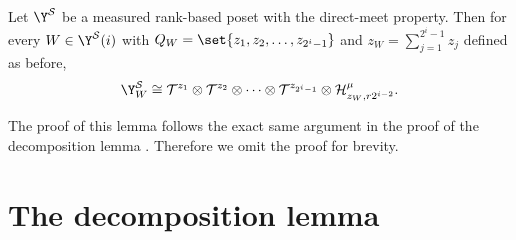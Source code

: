 \begin{lemma}
  Let \(\Y^{\mathcal{S}}\) be a measured rank-based poset with the direct-meet property. Then for every \(W \in \Y^{\mathcal{S}}(i)\) with \(Q_W = \set{z_1,z_2,\dots,z_{2^i-1}}\) and \(z_W= \sum_{j=1}^{2^i-1} z_j\) defined as before,
  \[\Y^{\mathcal{S}}_W \cong \mathcal{T}^{z_1} \otimes \mathcal{T}^{z_2} \otimes \dots \otimes \mathcal{T}^{z_{2^i-1}} \otimes \mathcal{H}^{\mu}_{z_W,r2^{i-2}}.\]
\end{lemma}
The proof of this lemma follows the exact same argument in the proof of the decomposition lemma . Therefore we omit the proof for brevity.


\appendix
\section{The decomposition lemma} \label{app:loc-to-glob}
